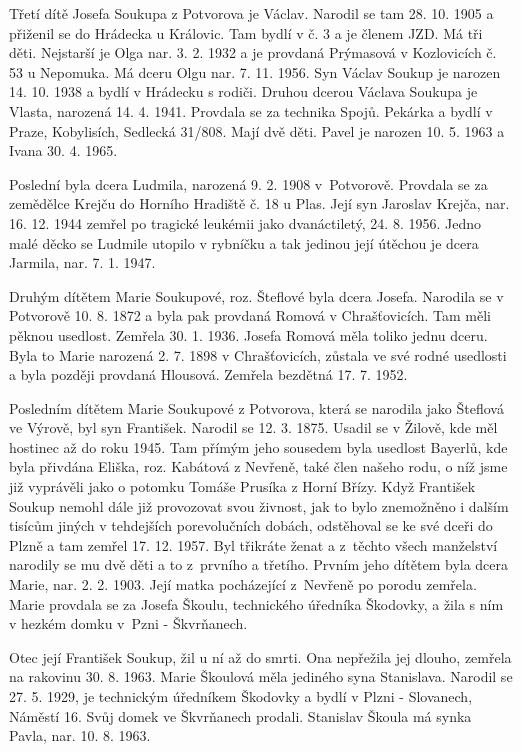 \documentclass[../dejiny-rodu-prusiku.tex]{subfiles}
\begin{document}
Třetí dítě Josefa Soukupa z Potvorova je Václav. Narodil se tam 28. 10. 1905 a přiženil se do Hrádecka u Královic. Tam bydlí v č. 3 a je členem JZD. Má tři děti. Nejstarší je Olga nar. 3. 2. 1932 a je provdaná Prýmasová v Kozlovicích č. 53 u Nepomuka. Má dceru Olgu nar. 7. 11. 1956. Syn Václav Soukup je narozen 14. 10. 1938 a bydlí v Hrádecku s rodiči. Druhou dcerou Václava Soukupa je Vlasta, narozená 14. 4. 1941. Provdala se za technika Spojů. Pekárka a bydlí v Praze, Kobylisích, Sedlecká 31/808. Mají dvě děti. Pavel je narozen 10. 5. 1963 a Ivana 30. 4. 1965.

Poslední byla dcera Ludmila, narozená 9. 2. 1908 v Potvorově. Provdala se za zemědělce Krejču do Horního Hradiště č. 18 u Plas. Její syn Jaroslav Krejča, nar. 16. 12. 1944 zemřel po tragické leukémii jako dvanáctiletý, 24. 8. 1956. Jedno malé děcko se Ludmile utopilo v rybníčku a tak jedinou její útěchou je dcera Jarmila, nar. 7. 1. 1947.

Druhým dítětem Marie Soukupové, roz. Šteflové byla dcera Josefa. Narodila se v Potvorově 10. 8. 1872 a byla pak provdaná Romová v Chrašťovicích. Tam měli pěknou usedlost. Zemřela 30. 1. 1936. Josefa Romová měla toliko jednu dce­ru. Byla to Marie narozená 2. 7. 1898 v Chrašťovicích, zůstala ve své rodné usedlosti a byla později provdaná Hlousová. Zemřela bezdětná 17. 7. 1952.

Posledním dítětem Marie Soukupové z Potvorova, která se narodila jako Šteflová ve Výrově, byl syn František. Narodil se 12. 3. 1875. Usadil se v Žilově, kde měl hostinec až do roku 1945. Tam přímým jeho sousedem byla usedlost Bayerlů, kde byla přivdána Eliška, roz. Kabátová z Nevřeně, také člen našeho rodu, o níž jsme již vyprávěli jako o potomku Tomáše Prusíka z Horní Břízy. Když František Soukup nemohl dále již provozovat svou živnost, jak to bylo znemožněno i dalším tisícům jiných v tehdejších po­revolučních dobách, odstěhoval se ke své dceři do Plzně a tam zemřel 17. 12. 1957. Byl třikráte ženat a z těchto všech manželství narodily se mu dvě děti a to z prvního a třetího. Prvním jeho dítětem byla dcera Marie, nar. 2. 2. 1903. Její matka pocházející z Nevřeně po porodu zemřela. Marie provdala se za Josefa Škoulu, technického úředníka Škodovky, a žila s ním v hezkém domku v Pzni - Škvrňanech.

Otec její František Soukup, žil u ní až do smrti. Ona nepřežila jej dlouho, zemřela na rakovinu 30. 8. 1963. Marie Škoulová měla jediného syna Stanislava. Narodil se 27. 5. 1929, je technickým úředníkem Škodovky a bydlí v Plzni - Slovanech, Náměstí 16. Svůj domek ve Škvrňanech prodali. Stanislav Škoula má synka Pavla, nar. 10. 8. 1963.
\end{document}

